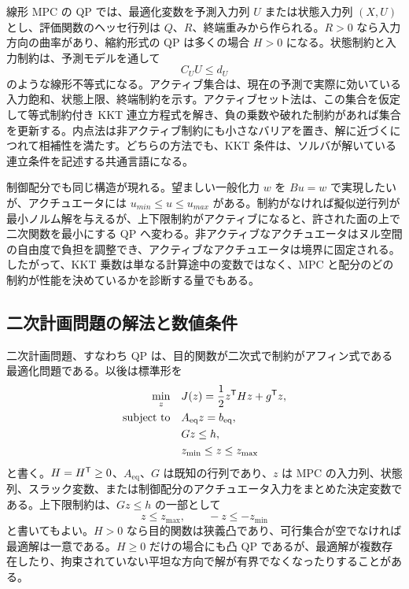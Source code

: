線形 MPC の QP では、最適化変数を予測入力列 $U$ または状態入力列 $(X,U)$ とし、評価関数のヘッセ行列は $Q$、$R$、終端重みから作られる。$R>0$ なら入力方向の曲率があり、縮約形式の QP は多くの場合 $H>0$ になる。状態制約と入力制約は、予測モデルを通して
\begin{equation}
  C_UU\le d_U
\end{equation}
のような線形不等式になる。アクティブ集合は、現在の予測で実際に効いている入力飽和、状態上限、終端制約を示す。アクティブセット法は、この集合を仮定して等式制約付き KKT 連立方程式を解き、負の乗数や破れた制約があれば集合を更新する。内点法は非アクティブ制約にも小さなバリアを置き、解に近づくにつれて相補性を満たす。どちらの方法でも、KKT 条件は、ソルバが解いている連立条件を記述する共通言語になる。

制御配分でも同じ構造が現れる。望ましい一般化力 $w$ を $Bu=w$ で実現したいが、アクチュエータには $u_{min}\le u\le u_{max}$ がある。制約がなければ擬似逆行列が最小ノルム解を与えるが、上下限制約がアクティブになると、許された面の上で二次関数を最小にする QP へ変わる。非アクティブなアクチュエータはヌル空間の自由度で負担を調整でき、アクティブなアクチュエータは境界に固定される。したがって、KKT 乗数は単なる計算途中の変数ではなく、MPC と配分のどの制約が性能を決めているかを診断する量でもある。

\subsection{二次計画問題の解法と数値条件}

二次計画問題、すなわち QP は、目的関数が二次式で制約がアフィン式である最適化問題である。以後は標準形を
\begin{align}
  \min_z\quad &
  J(z)=\frac{1}{2}z^{\mathsf{T}} Hz+g^{\mathsf{T}} z,\\
  \text{subject to}\quad &
  A_{\mathrm{eq}}z=b_{\mathrm{eq}},\\
  &Gz\le h,\\
  &z_{\min}\le z\le z_{\max}
\end{align}
と書く。$H=H^{\mathsf{T}}\ge0$、$A_{\mathrm{eq}}$、$G$ は既知の行列であり、$z$ は MPC の入力列、状態列、スラック変数、または制御配分のアクチュエータ入力をまとめた決定変数である。上下限制約は、$Gz\le h$ の一部として
\begin{equation}
  z\le z_{\max},
  \qquad
  -z\le -z_{\min}
\end{equation}
と書いてもよい。$H>0$ なら目的関数は狭義凸であり、可行集合が空でなければ最適解は一意である。$H\ge0$ だけの場合にも凸 QP であるが、最適解が複数存在したり、拘束されていない平坦な方向で解が有界でなくなったりすることがある。


